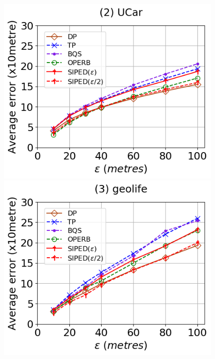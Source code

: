 \begin{figure}[tb!]
\centering
\includegraphics[scale = 0.320]{Figures/Exp-query-PED-error-epsilon-service.png}\hspace{3ex}
\includegraphics[scale = 0.320]{Figures/Exp-query-PED-error-epsilon-geolife.png}\hspace{3ex}

\end{figure}
